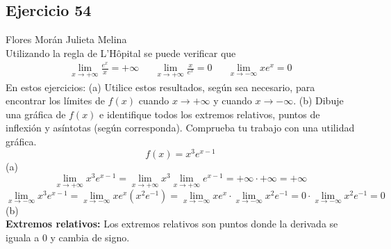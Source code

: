 \documentclass[12pt]{article}
\begin{document}
\subsection{Ejercicio 54} Flores Morán Julieta Melina \\

Utilizando la regla de L'Hôpital se puede verificar que
\begin{align*}
  \lim_{x \to +\infty} \frac{e^x}{x}=+\infty && \lim_{x \to +\infty} \frac{x}{e^x}=0 && \lim_{x \to -\infty} xe^x=0
\end{align*}
En estos ejercicios: (a) Utilice estos resultados, según sea necesario, para encontrar los límites de $f(x)$ cuando $x\rightarrow +\infty$ y cuando $x\rightarrow -\infty$. (b) Dibuje una gráfica de $f(x)$ e identifique todos los extremos relativos, puntos de inflexión y asíntotas (según corresponda). Comprueba tu trabajo con una utilidad gráfica.
\[
f(x)=x^3e^{x-1}
\]
(a)\\

\[
 \lim_{x \to +\infty}  x^3e^{x-1} = \lim_{x \to +\infty}  x^3  \lim_{x \to +\infty} e^{x-1}  = +\infty \cdot +\infty = +\infty
\]
\[
\lim_{x \to -\infty}  x^3e^{x-1} = \lim_{x \to -\infty}  xe^{x} (x^{2}e^{-1}) =  \lim_{x \to -\infty} xe^{x} \cdot \lim_{x \to -\infty} x^{2}e^{-1} = 0 \cdot \lim_{x \to -\infty} x^{2}e^{-1} = 0
\]
 (b) \\
 \textbf{Extremos relativos:}
 Los extremos relativos son puntos donde la derivada se iguala a 0 y cambia de signo.
 
\end{document}
